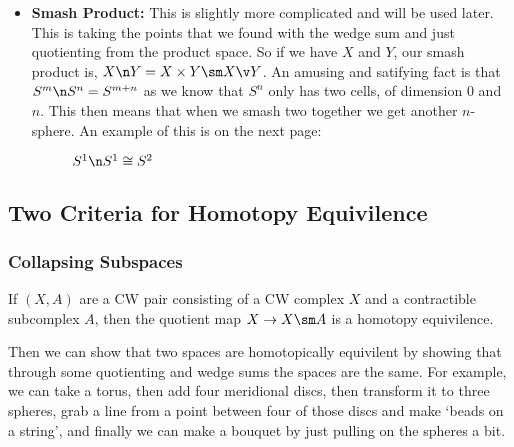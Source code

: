 \begin{itemize}
  \item \textbf{Smash Product: }This is slightly more complicated and will be used later. This is taking the points that we found with the wedge sum and just quotienting from the product space. So if we have $X$ and $Y$, our smash product is, $X \n Y = X \times Y \sm X \v Y$. An amusing and satifying fact is that $S^m \n S^n = S^{m+n}$ as we know that $S^n$ only has two cells, of dimension $0$ and $n$. This then means that when we smash two together we get another $n$-sphere. An example of this is on the next page:
  \begin{figure}[!ht]
  \centering
  \caption{$S^1 \n S^1 \cong S^2$}
  \end{figure}
\end{itemize}

\subsection{Two Criteria for Homotopy Equivilence}
\subsubsection{Collapsing Subspaces}
\begin{claim}
  If $(X, A)$ are a CW pair consisting of a CW complex $X$ and a contractible subcomplex $A$, then the quotient map $X \to X \sm A$ is a homotopy equivilence.
\end{claim}
Then we can show that two spaces are homotopically equivilent by showing that through some quotienting and wedge sums the spaces are the same. For example, we can take a torus, then add four meridional discs, then transform it to three spheres, grab a line from a point between four of those discs and make `beads on a string', and finally we can make a bouquet by just pulling on the spheres a bit.

